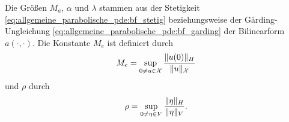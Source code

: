 \begin{Satz}
\begin{Beweis}


    \end{Beweis}
\end{Satz}

Die Größen $M_{a}$, $\alpha$ und $\lambda$ stammen aus der Stetigkeit \eqref{eq:allgemeine_parabolische_pde:bf_stetig} beziehungsweise der G\aa rding-Ungleichung \eqref{eq:allgemeine_parabolische_pde:bf_garding} der Bilinearform $a(\cdot, \cdot)$.
Die Konstante $M_{e}$ ist definiert  durch
\begin{equation}
    \label{eq:var_all_M_e}
    M_{e} = \sup_{0 \neq u \in \mathcal X} \frac{\lVert u(0)\rVert_{H}}{\lVert u\rVert_{\mathcal X}}
\end{equation}
und $\rho$ durch
\begin{equation}
    \label{eq:var_all_rho}
    \rho = \sup_{0 \neq \eta \in V} \frac{\lVert\eta\rVert_{H}}{\lVert\eta\rVert_{V}}.
\end{equation}



